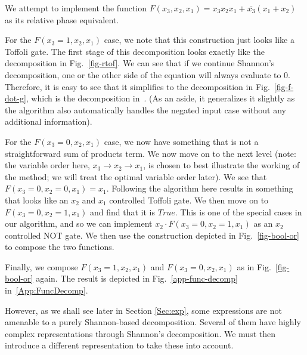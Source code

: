 \begin{example}
  \label{ex-bool}
  We attempt to implement the function $F(x_3,x_2,x_1) = x_3x_2x_1 + \overline{x_3}(x_1 + x_2)$ as its relative phase equivalent.

  For the $F(x_3 = 1,x_2,x_1)$ case, we note that this construction just looks like a Toffoli gate. The first stage of this decomposition looks exactly like the decomposition in Fig.~\ref{fig-rtof}. We can see that if we continue Shannon's decomposition, one or the other side of the equation will always evaluate to 0. Therefore, it is easy to see that it simplifies to the
  decomposition in Fig.~\ref{fig-f-dot-g}, which is the decomposition in~\cite{bib-amy-phase-state}.
  (As an aside, it generalizes it slightly as the algorithm also automatically handles the negated input
  case without any additional information). %
  
  For the $F(x_3 = 0,x_2,x_1)$ case, we now have something that is not a straightforward sum of products term.
  We now move on to the next level (note: the variable order here, $x_3 \rightarrow x_2 \rightarrow x_1$, is chosen to best illustrate the working of the method; we will treat the optimal variable order later). We see that $F(x_3 = 0,x_2=0,x_1) = x_1$. Following the algorithm here results in something that looks like an $x_2$
  and $x_1$ controlled Toffoli gate. We then move on to $F(x_3 = 0,x_2=1,x_1)$ and find that it is $True$.
  This is one of the special cases in our algorithm, and so we can implement $x_2 \cdot F(x_3 = 0,x_2=1,x_1)$
  as an $x_2$ controlled NOT gate. We then use the construction depicted in Fig.~\ref{fig-bool-or} to compose
  the two functions. %
  
  Finally, we compose $F(x_3 = 1,x_2,x_1)$ and $F(x_3 = 0,x_2,x_1)$ as in Fig.~\ref{fig-bool-or} again. The result is depicted in Fig.~\ref{app-func-decomp} in~\ref{App:FuncDecomp}.
\end{example}

However, as we shall see later in Section \ref{Sec:exp}, some expressions are not amenable to a purely Shannon-based
decomposition. Several of them have highly complex representations through Shannon's decomposition.
We must then introduce a different representation to take these into account.

